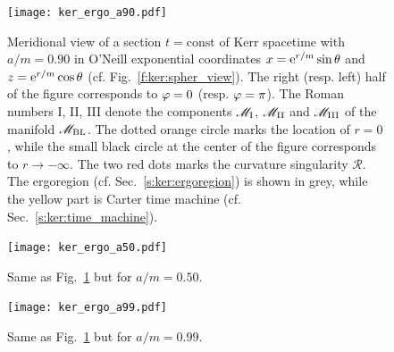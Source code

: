 \begin{figure}
\centerline{\texttt{[image: ker\_ergo\_a90.pdf]}}
\caption[]{\label{f:ker:ergo_a90} \footnotesize
Meridional view of a section $t=\mathrm{const}$ of Kerr spacetime with $a/m=0.90$ in
O'Neill exponential coordinates $x = \mathrm{e}^{r/m}\sin\theta$ and $z = \mathrm{e}^{r/m}\cos\theta$ (cf. Fig.~\ref{f:ker:spher_view}).
The right (resp. left) half of the figure corresponds to $\varphi=0$ (resp. $\varphi=\pi$).
The Roman numbers I, II, III denote the components $\mathscr{M}_{\rm I}$, $\mathscr{M}_{\rm II}$ and
$\mathscr{M}_{\rm III}$ of the manifold $\mathscr{M}_{\rm BL}$. The dotted orange circle marks the location
of $r=0$, while the small black circle at the center of the figure corresponds to
$r\rightarrow -\infty$. The two red dots marks the curvature singularity $\mathscr{R}$.
The ergoregion (cf. Sec.~\ref{s:ker:ergoregion}) is shown in grey, while the
yellow part is Carter time machine (cf. Sec.~\ref{s:ker:time_machine}).
}
\end{figure}

\begin{figure}
\centerline{\texttt{[image: ker\_ergo\_a50.pdf]}}
\caption[]{\label{f:ker:ergo_a50} \footnotesize
Same as Fig.~\ref{f:ker:ergo_a90} but for $a/m=0.50$.
}
\end{figure}

\begin{figure}
\centerline{\texttt{[image: ker\_ergo\_a99.pdf]}}
\caption[]{\label{f:ker:ergo_a99} \footnotesize
Same as Fig.~\ref{f:ker:ergo_a90} but for $a/m=0.99$.
}
\end{figure}

